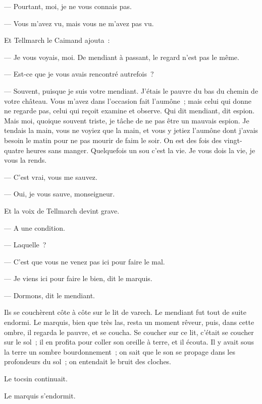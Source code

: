 \documentclass[french,twoside]{book} %
\begin{document}
— Pourtant, moi, je ne vous connais pas.\par
— Vous m’avez vu, mais vous ne m’avez pas vu.\par
Et Tellmarch le Caimand ajouta :\par
— Je vous voyais, moi. De mendiant à passant, le regard n’est pas le même.\par
— Est-ce que je vous avais rencontré autrefois ?\par
— Souvent, puisque je suis votre mendiant. J’étais le pauvre du bas du chemin de votre château. Vous m’avez dans l’occasion fait l’aumône ; mais celui qui donne ne regarde pas, celui qui reçoit examine et observe. Qui dit mendiant, dit espion. Mais moi, quoique souvent triste, je tâche de ne pas être un mauvais espion. Je tendais la main, vous ne voyiez que la main, et vous y jetiez l’aumône dont j’avais  besoin le matin pour ne pas mourir de faim le soir. On est des fois des vingt-quatre heures sans manger. Quelquefois un sou c’est la vie. Je vous dois la vie, je vous la rends.\par
— C’est vrai, vous me sauvez.\par
— Oui, je vous sauve, monseigneur.\par
Et la voix de Tellmarch devint grave.\par
— A une condition.\par
— Laquelle ?\par
— C’est que vous ne venez pas ici pour faire le mal.\par
— Je viens ici pour faire le bien, dit le marquis.\par
— Dormons, dit le mendiant.\par
Ils se couchèrent côte à côte sur le lit de varech. Le mendiant fut tout de suite endormi. Le marquis, bien que très las, resta un moment rêveur, puis, dans cette ombre, il regarda le pauvre, et se coucha. Se coucher sur ce lit, c’était se coucher sur le sol ; il en profita pour coller son oreille à terre, et il écouta. Il y avait sous la terre un sombre bourdonnement ; on sait que le son se propage dans les profondeurs du sol ; on entendait le bruit des cloches.\par
Le tocsin continuait.\par
Le marquis s’endormit.
\end{document}
